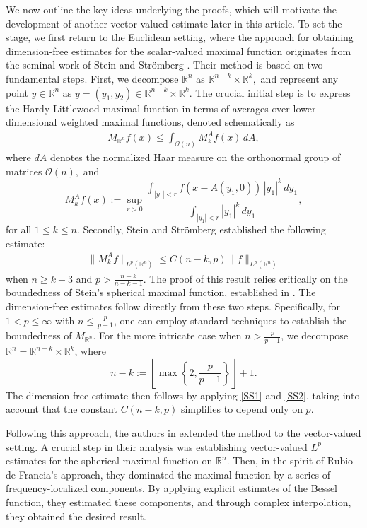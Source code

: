 \documentclass[11pt]{amsart}
\newcommand {\R}{\mathbb R}
\theoremstyle{definition}
\numberwithin{equation}{section}
\begin{document}
We now outline the key ideas underlying the proofs, which will motivate the development of another vector-valued estimate later in this article. To set the stage, we first return to the Euclidean setting, where the approach for obtaining dimension-free estimates for the scalar-valued maximal function originates from the seminal work of Stein and Strömberg \cite{SS}. Their method is based on two fundamental steps. First, we decompose $\mathbb{R}^n$ as $\mathbb{R}^{n-k}\times \mathbb{R}^k,$ and represent any point $y\in \mathbb{R}^n$ as $y=(y_1, y_2)\in \mathbb{R}^{n-k}\times \mathbb{R}^k.$  The crucial initial step is to express the Hardy-Littlewood maximal function in terms of averages over lower-dimensional weighted maximal functions, denoted schematically as 
\begin{align}
\label{SS1}
M_{\mathbb{R}^n}f(x)\leq \int_{\mathcal{O}(n)} M_{k}^{A}f(x)\, dA,   
\end{align}
where $dA$ denotes the normalized Haar measure on the orthonormal group of matrices $\mathcal{O}(n),$ and
$$M_{k}^{A}f(x):=\sup_{r>0}\frac{\int_{|y_1|<r} f(x-A(y_{1}, 0))\,|y_1|^{k} \, dy_{1}}{\int_{|y_1|<r} |y_1|^{k}\, dy_{1}},$$
for all $1\leq k\leq n.$ Secondly, Stein and Strömberg \cite{SS} established the following estimate:
\begin{align}
\label{SS2}
\|M_{k}^{A}f\|_{L^p(\mathbb{R}^n)}\leq C(n-k, p)\|f\|_{L^p(\mathbb{R}^n)}
\end{align}
 when $n\geq k+ 3$ and $p>\frac{n-k}{n-k-1}.$ The proof of this result relies critically on the boundedness of Stein's spherical maximal function, established in \cite{SteinSph}.  The dimension-free estimates follow directly from these two steps. Specifically, for $1 < p \leq \infty$ with $n \leq \frac{p}{p-1}$, one can employ standard techniques to establish the boundedness of $M_{\R^n}$. For the more intricate case when $n > \frac{p}{p-1}$, we decompose $\mathbb{R}^n = \mathbb{R}^{n-k} \times \mathbb{R}^k$, where  
 \[
n-k := \left\lfloor \max\left\{2, \frac{p}{p-1}\right\} \right\rfloor + 1.  
\]  
 The dimension-free estimate then follows by applying \eqref{SS1} and \eqref{SS2}, taking into account that the constant $C(n-k, p)$ simplifies to depend only on $p$.
 

 
 Following this approach, the authors in \cite{DK} extended the method to the vector-valued setting. A crucial step in their analysis was establishing vector-valued $L^p$ estimates for the spherical maximal function on $\R^n.$ Then, in the spirit of Rubio de Francia's approach, they dominated the maximal function by a series of frequency-localized components. By applying explicit estimates of the Bessel function, they estimated these components, and through complex interpolation, they obtained the desired result.
\end{document}
